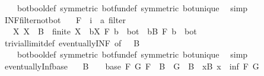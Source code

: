 \begin{isabellebody}
\ \ \ \ bot{\isacharunderscore}{\kern0pt}bool{\isacharunderscore}{\kern0pt}def\ {\isacharbrackleft}{\kern0pt}symmetric{\isacharbrackright}{\kern0pt}\ bot{\isacharunderscore}{\kern0pt}fun{\isacharunderscore}{\kern0pt}def\ {\isacharbrackleft}{\kern0pt}symmetric{\isacharbrackright}{\kern0pt}\ bot{\isacharunderscore}{\kern0pt}unique\ \isamarkupfalse%
\ simp%
\endisatagproof
{\isafoldproof}%
%
\isadelimproof
\isanewline
%
\endisadelimproof
\isanewline
{}\isamarkupfalse%
\ INF{\isacharunderscore}{\kern0pt}filter{\isacharunderscore}{\kern0pt}not{\isacharunderscore}{\kern0pt}bot{\isacharcolon}{\kern0pt}\isanewline
\ \ \ F\ {\isacharcolon}{\kern0pt}{\isacharcolon}{\kern0pt}\ {\isachardoublequoteopen}{\isacharprime}{\kern0pt}i\ {\isasymRightarrow}\ {\isacharprime}{\kern0pt}a\ filter{\isachardoublequoteclose}\isanewline
\ \ \ {\isachardoublequoteopen}{\isacharparenleft}{\kern0pt}{\isasymAnd}X{\isachardot}{\kern0pt}\ X\ {\isasymsubseteq}\ B\ {\isasymLongrightarrow}\ finite\ X\ {\isasymLongrightarrow}\ {\isacharparenleft}{\kern0pt}{\isasymSqinter}b{\isasymin}X{\isachardot}{\kern0pt}\ F\ b{\isacharparenright}{\kern0pt}\ {\isasymnoteq}\ bot{\isacharparenright}{\kern0pt}\ {\isasymLongrightarrow}\ {\isacharparenleft}{\kern0pt}{\isasymSqinter}b{\isasymin}B{\isachardot}{\kern0pt}\ F\ b{\isacharparenright}{\kern0pt}\ {\isasymnoteq}\ bot{\isachardoublequoteclose}\isanewline
%
\isadelimproof
\ \ %
\endisadelimproof
%
\isatagproof
{}\isamarkupfalse%
\ trivial{\isacharunderscore}{\kern0pt}limit{\isacharunderscore}{\kern0pt}def\ eventually{\isacharunderscore}{\kern0pt}INF\ {\isacharbrackleft}{\kern0pt}of\ {\isacharunderscore}{\kern0pt}\ {\isacharunderscore}{\kern0pt}\ B{\isacharbrackright}{\kern0pt}\isanewline
\ \ \ \ bot{\isacharunderscore}{\kern0pt}bool{\isacharunderscore}{\kern0pt}def\ {\isacharbrackleft}{\kern0pt}symmetric{\isacharbrackright}{\kern0pt}\ bot{\isacharunderscore}{\kern0pt}fun{\isacharunderscore}{\kern0pt}def\ {\isacharbrackleft}{\kern0pt}symmetric{\isacharbrackright}{\kern0pt}\ bot{\isacharunderscore}{\kern0pt}unique\ \isamarkupfalse%
\ simp%
\endisatagproof
{\isafoldproof}%
%
\isadelimproof
\isanewline
%
\endisadelimproof
\isanewline
{}\isamarkupfalse%
\ eventually{\isacharunderscore}{\kern0pt}Inf{\isacharunderscore}{\kern0pt}base{\isacharcolon}{\kern0pt}\isanewline
\ \ \ {\isachardoublequoteopen}B\ {\isasymnoteq}\ {\isacharbraceleft}{\kern0pt}{\isacharbraceright}{\kern0pt}{\isachardoublequoteclose}\ \ base{\isacharcolon}{\kern0pt}\ {\isachardoublequoteopen}{\isasymAnd}F\ G{\isachardot}{\kern0pt}\ F\ {\isasymin}\ B\ {\isasymLongrightarrow}\ G\ {\isasymin}\ B\ {\isasymLongrightarrow}\ {\isasymexists}x{\isasymin}B{\isachardot}{\kern0pt}\ x\ {\isasymle}\ inf\ F\ G{\isachardoublequoteclose}\isanewline

\end{isabellebody}
